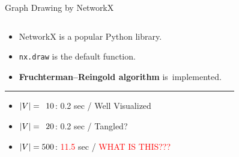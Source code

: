 \documentclass[dvipdfmx,13pt,aspectratio=169]{beamer}
\newcommand{\red}[1]{\textcolor{red}{#1}}
\newif\ifShowHidden
\begin{document}
\ifShowHidden
  \begin{frame}{Graph Drawing by NetworkX}
    \begin{columns}
      \begin{column}{0.62\columnwidth}
        \begin{itemize}
          \item NetworkX
                is a popular Python library.
          \item \texttt{nx.draw} is the default function.
          \item \large{\textbf{Fruchterman--Reingold algorithm}} is~implemented.
        \end{itemize}
        \begin{center}
          \rule{0.8\columnwidth}{0.4pt}
        \end{center}
        \begin{itemize}
          \item<1-> \Large{$\abs{V}=\phantom{0}10$: \phantom{1}0.2 sec / Well Visualized}
          \item<2-> \Large{$\abs{V}=\phantom{0}20$: \phantom{1}0.2 sec / Tangled?}
          \item<3-> \Large{$\abs{V}=500$: \red{11.5} sec / \red{WHAT IS THIS???}}
        \end{itemize}
      \end{column}
      \begin{column}{0.38\columnwidth}
        \begin{figure}[htbp]
          \centering

\end{figure}
\end{column}
\end{columns}
\end{frame}
\end{document}
